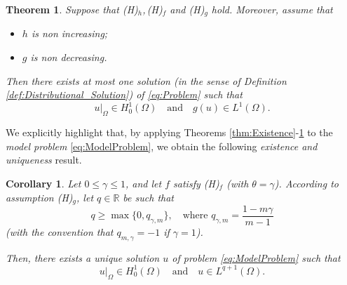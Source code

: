 \documentclass[11pt,a4paper]{amsart}
\theoremstyle{definition}
\theoremstyle{plain}
\newtheorem{theorem}[definition]{Theorem}
\newtheorem{corollary}[definition]{Corollary}
\numberwithin{equation}{section}
\begin{document}
\begin{theorem}\label{thm:Uniqueness}
Suppose that \emph{(H)}$_h$,\,\emph{(H)}$_f$ and \emph{(H)}$_g$ hold. Moreover, assume that 
\begin{itemize}
\item[i)]	$h$ is non increasing;
\item[ii)]  $g$ is non decreasing.
\end{itemize}
 Then there exists at most one solution (in the sense of Definition \ref{def:Distributional_Solution}) of \eqref{eq:Problem} such that
\begin{equation*}
u|_\Omega \in H_0^1(\Omega) \quad \textrm{and} \quad g(u)\in L^{1}(\Omega).
\end{equation*}
\end{theorem}
We explicitly highlight that, by applying  Theorems \ref{thm:Existence}-\ref{thm:Uniqueness}
to the \emph{model problem} \eqref{eq:ModelProblem},
we obtain the following \emph{existence and uniqueness} result.
\begin{corollary} \label{cor:ModelProblemEU}
	Let $0\leq \gamma\leq 1$, and let $f$ satisfy
	\emph{(H)}$_f$ (with $\theta = \gamma$). According to assumption \emph{(H)}$_g$,  let $q\in\mathbb{R}$ be such that
	$$q\geq \max\{0,q_{\gamma,m}\}, \quad\text{where $q_{\gamma,m}
	= \frac{1-m\gamma}{m-1}$}$$
	(with the convention that $q_{m,\gamma} = -1$ if $\gamma = 1$).
	
	Then, there exists a unique solution $u$ of problem \eqref{eq:ModelProblem} such that
	$$u|_\Omega\in H_0^1(\Omega)\quad\text{and}\quad u\in L^{q+1}(\Omega).$$
\end{corollary}
\medskip
\end{document}
